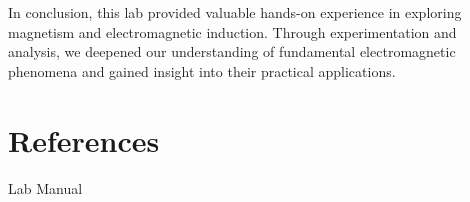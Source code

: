 \documentclass[11pt]{article}
\let\oldsection\section
\renewcommand\section{\clearpage\oldsection}
\begin{document}
    In conclusion, this lab provided valuable hands-on experience in exploring magnetism and electromagnetic induction. Through experimentation and analysis, we deepened our understanding of fundamental electromagnetic phenomena and gained insight into their practical applications.

    \appendix
    \section{References}\label{sec:references}

    Lab Manual
\end{document}
